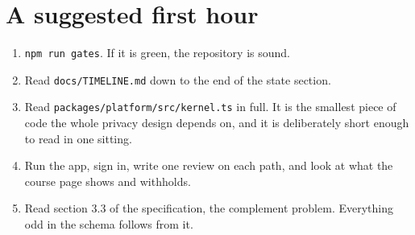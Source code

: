\documentclass[11pt,a4paper]{article}
\begin{document}
\section{A suggested first hour}

\begin{enumerate}[leftmargin=*]
  \item \texttt{npm run gates}. If it is green, the repository is sound.
  \item Read \texttt{docs/TIMELINE.md} down to the end of the state section.
  \item Read \texttt{packages/platform/src/kernel.ts} in full. It is the
        smallest piece of code the whole privacy design depends on, and it is
        deliberately short enough to read in one sitting.
  \item Run the app, sign in, write one review on each path, and look at what
        the course page shows and withholds.
  \item Read section 3.3 of the specification, the complement problem.
        Everything odd in the schema follows from it.
\end{enumerate}
\end{document}
